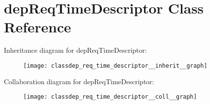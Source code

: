 \hypertarget{classdep_req_time_descriptor}{}\section{dep\+Req\+Time\+Descriptor Class Reference}
\label{classdep_req_time_descriptor}


Inheritance diagram for dep\+Req\+Time\+Descriptor\+:\nopagebreak
\begin{figure}[H]
\begin{center}
\leavevmode
\texttt{[image: classdep\_req\_time\_descriptor\_\_inherit\_\_graph]}
\end{center}
\end{figure}


Collaboration diagram for dep\+Req\+Time\+Descriptor\+:\nopagebreak
\begin{figure}[H]
\begin{center}
\leavevmode
\texttt{[image: classdep\_req\_time\_descriptor\_\_coll\_\_graph]}
\end{center}
\end{figure}
